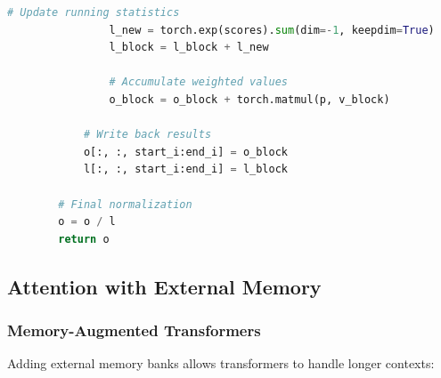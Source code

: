\documentclass[11pt]{article}
\begin{document}
\begin{lstlisting}[language=Python, caption=Flash Attention Concept]
                # Update running statistics
                l_new = torch.exp(scores).sum(dim=-1, keepdim=True)
                l_block = l_block + l_new
                
                # Accumulate weighted values
                o_block = o_block + torch.matmul(p, v_block)
            
            # Write back results
            o[:, :, start_i:end_i] = o_block
            l[:, :, start_i:end_i] = l_block
        
        # Final normalization
        o = o / l
        return o
\end{lstlisting}

\subsection{Attention with External Memory}

\subsubsection{Memory-Augmented Transformers}

Adding external memory banks allows transformers to handle longer contexts:
\end{document}
